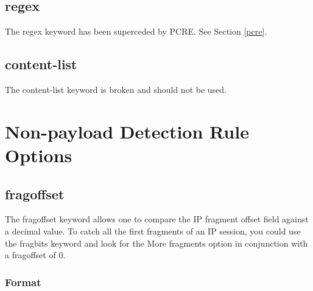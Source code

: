 \documentclass[english]{report}
\begin{document}
\subsection{regex}

The regex keyword has been superceded by PCRE.  See Section \ref{pcre}.

\subsection{content-list}

The content-list keyword is broken and should not be used.

%
%
%
%


\section{Non-payload Detection Rule Options}
\subsection{fragoffset \label{fragoffset section}}

The fragoffset keyword allows one to compare the IP fragment offset
field against a decimal value. To catch all the first fragments of
an IP session, you could use the fragbits keyword and look for the
More fragments option in conjunction with a fragoffset of 0.


\subsubsection{Format}
\end{document}
